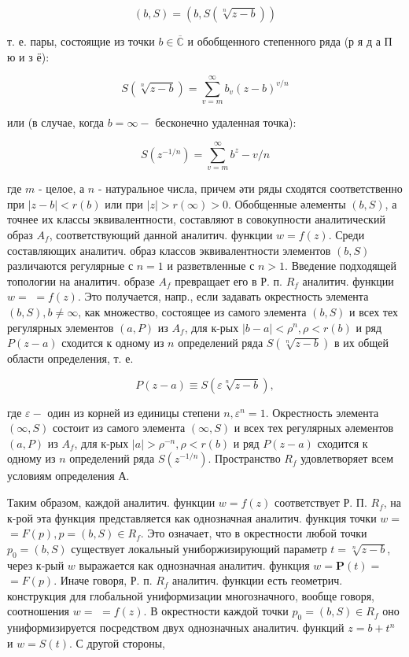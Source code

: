 \documentclass[10pt]{article}
\begin{document}
\[

(b, S)=(b, S(\sqrt[n]{z-b}))

\]



т. е. пары, состоящие из точки $b \in \overline{\mathbb{C}}$ и обобщенного степенного ряда (р я д а П ю и з ё):



\[

S(\sqrt[n]{z-b})=\sum_{v=m}^{\infty} b_{v}(z-b)^{v / n}

\]



или (в случае, когда $b=\infty-$ бесконечно удаленная точка):



\[

S\left(z^{-1 / n}\right)=\sum_{v=m}^{\infty} b^{z}-v / n

\]



где $m$ - целое, а $n$ - натуральное числа, причем әти ряды сходятся соответственно при $|z-b|<r(b)$ или при $|z|>r(\infty)>0$. Обобщенные әлементы $(b, S)$, а точнее их классы эквивалентности, составляют в совокупности аналитический образ $A_{f}$, соответствующий данной аналитич. функции $w=f(z)$. Среди составляющих аналитич. образ классов эквивалентности элементов $(b, S)$ различаются регулярные с $n=1$ и разветвленные с $n>1$. Введение подходящей топологии на аналитич. образе $A_{f}$ превращает его в Р. п. $R_{f}$ аналитич. функции $w=$ $=f(z)$. Это получается, напр., если задавать окрестность элемента $(b, S), b \neq \infty$, как множество, состоящее из самого элемента $(b, S)$ и всех тех регулярных элементов $(a, P)$ из $A_{f}$, для к-рых $|b-a|<\rho^{n}, \rho<r(b)$ и ряд $P(z-a)$ сходится к одному из $n$ определений ряда $S(\sqrt[n]{z-b})$ в их общей области определения, т. е.



\[

P(z-a) \equiv S(\varepsilon \sqrt[n]{z-b}),

\]



где $\varepsilon-$ один из корней из единицы степени $n, \varepsilon^{n}=1$. Окрестность элемента $(\infty, S)$ состоит из самого элемента $(\infty, S)$ и всех тех регулярных әлементов $(a, P)$ из $A_{f}$, для к-рых $|a|>\rho^{-n}, \rho<r(b)$ и ряд $P(z-a)$ сходится к одному из $n$ определений ряда $S\left(z^{-1 / n}\right)$. Пространство $R_{f}$ удовлетворяет всем условиям определения А.



Таким образом, каждой аналитич. функции $w=f(z)$ соответствует Р. П. $R_{f}$, на к-рой эта функция представляется как однозначная аналитич. функция точки $w=$ $=F(p), p=(b, S) \in R_{f}$. Это означает, что в окрестности любой точки $p_{0}=(b, S)$ существует локальный униборжизирующий параметр $t=\sqrt[n]{z-b}$, через к-рый $w$ выражается как однозначная аналитич. функция $w=\boldsymbol{P}(t)=$ $=F(p)$. Иначе говоря, Р. п. $R_{f}$ аналитич. функции есть геометрич. конструкция для глобальной униформизации многозначного, вообще говоря, соотношения $w=$ $=f(z)$. В окрестности каждой точки $p_{0}=(b, S) \in R_{f}$ оно униформизируется посредством двух однозначных аналитич. функций $z=b+t^{n}$ и $w=S(t)$. С другой стороны,
\end{document}
